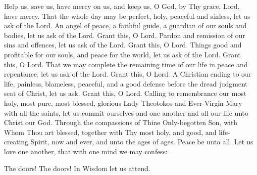 \begin{liturgicaltext}
    \deacon Help us, save us, have mercy on us, and keep us, O God, by Thy grace.
    \choir Lord, have mercy.
    \deacon That the whole day may be perfect, holy, peaceful and sinless, let us ask of the Lord.
    \choir {}
    \deacon An angel of peace, a faithful guide, a guardian of our souls and bodies, let us ask of the Lord. 
    \choir Grant this, O Lord.
    \deacon Pardon and remission of our sins and offences, let us ask of the Lord.
    \choir Grant this, O Lord.
    \deacon Things good and profitable for our souls, and peace for the world, let us ask of the Lord.
    \choir Grant this, O Lord.
    \deacon That we may complete the remaining time of our life in peace and repentance, let us ask of the Lord.
    \choir Grant this, O Lord.
    \deacon A Christian ending to our life, painless, blameless, peaceful, and a good defense before the dread judgment seat of Christ, let us ask.
    \choir Grant this, O Lord. \pagebreak
    \deacon Calling to remembrance our most holy, most pure, most blessed, glorious Lady Theotokos and Ever-Virgin Mary with all the saints, let us commit ourselves and one another and all our life unto Christ our God.
    \choir {}
    \priest Through the compassions of Thine Only-begotten Son, with Whom Thou art blessed, together with Thy most holy, and good, and life-creating Spirit, now and ever, and unto the ages of ages. 
    \choir {}
    \priest Peace be unto all.
    \choir {}
    \priest Let us love one another, that with one mind we may confess: \newpage
    \choir 
\end{liturgicaltext}
\begin{liturgicaltext}
    \deacon The doors! The doors! In Wisdom let us attend. 
\end{liturgicaltext}